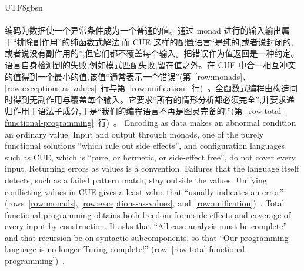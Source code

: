 \begin{CJK*}{UTF8}{gbsn}
\paragraph{}
\ifPaperChinese
编码为数据使一个异常条件成为一个普通的值。通过 monad 进行的输入输出属于``排除副作用''的纯函数式解法,而 CUE 这样的配置语言``是纯的,或者说封闭的,或者说没有副作用的'',但它们都不覆盖每个输入。把错误作为值返回是一种约定。语言自身检测到的失败,例如模式匹配失败,留在值之外。在 CUE 中合一相互冲突的值得到一个最小的值,该值``通常表示一个错误''(第~\ref{row:monads}、\ref{row:exceptions-as-values}~行与第~\ref{row:unification}~行)~\cite[\S\S~1, 2]{peytonjones1993-imperative-functional-programming}\cite[\S\S~2.1, 3.5]{peytonjones1999-imprecise-exceptions}\cite{cue-authors-configuration-use-case, cue-authors-cue-specification}。全函数式编程由构造同时得到无副作用与覆盖每个输入。它要求``所有的情形分析都必须完全'',并要求递归作用于语法子成分,于是``我们的编程语言不再是图灵完备的!''(第~\ref{row:total-functional-programming}~行)~\cite[第~755--759~页]{turner2004-total-functional-programming}。
\else
Encoding as data makes an abnormal condition an ordinary value.
Input and output through monads, one of the purely functional solutions ``which rule out side effects'',
and configuration languages such as CUE, which is ``pure, or hermetic, or side-effect free'', do not
cover every input.
Returning errors as values is a convention.
Failures that the language itself detects, such as a failed pattern match, stay outside the values.
Unifying conflicting values in CUE gives a least value that ``usually indicates an error''
(rows~\ref{row:monads}, \ref{row:exceptions-as-values}, and~\ref{row:unification})~\cite[\S\S~1, 2]{peytonjones1993-imperative-functional-programming}\cite[\S\S~2.1, 3.5]{peytonjones1999-imprecise-exceptions}\cite{cue-authors-configuration-use-case, cue-authors-cue-specification}.
Total functional programming obtains both freedom from side effects and coverage of every input by
construction.
It asks that ``All case analysis must be complete'' and that recursion be on syntactic subcomponents, so
that ``Our programming language is no longer Turing complete!''
(row~\ref{row:total-functional-programming})~\cite[pp.~755--759]{turner2004-total-functional-programming}.
\fi


\end{CJK*}
